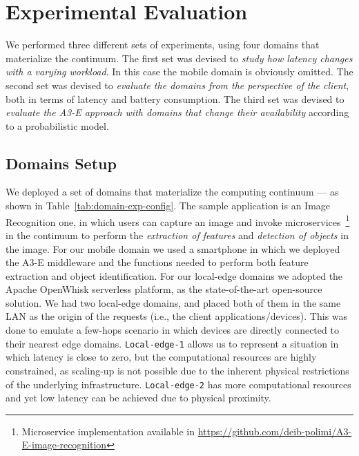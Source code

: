\section{Experimental Evaluation}\label{sec:evaluation}

We performed three different sets of experiments, using four domains that materialize the continuum. The first set was devised to \emph{study how latency changes with a varying workload}. In this case the mobile domain is obviously omitted. The second set was devised to \emph{evaluate the domains from the perspective of the client}, both in terms of latency and battery consumption. The third set was devised to \emph{evaluate the A3-E approach with domains that change their availability} according to a probabilistic model. 

\subsection{Domains Setup}


We deployed a set of domains that materialize the computing continuum --- as shown in Table~\ref{tab:domain-exp-config}. The sample application is an Image Recognition one, in which users can capture an image and invoke microservices~\footnote{Microservice implementation available in \url{https://github.com/deib-polimi/A3-E-image-recognition}} in the continuum to perform the \textit{extraction of features} and \textit{detection of objects} in the image. For our mobile domain we used a smartphone in which we deployed the A3-E middleware and the functions needed to perform both feature extraction and object identification. For our local-edge domains we adopted the Apache OpenWhisk serverless platform, as the state-of-the-art open-source solution. We had two local-edge domains, and placed both of them in the same LAN as the origin of the requests (i.e., the client applications/devices). This was done to emulate a few-hops scenario in which devices are directly connected to their nearest edge domains. \texttt{Local-edge-1} allows us to represent a situation in which latency is close to zero, but the computational resources are highly constrained, as scaling-up is not possible due to the inherent physical restrictions of the underlying infrastructure. \texttt{Local-edge-2} has more computational resources and yet low latency can be achieved due to physical proximity.

